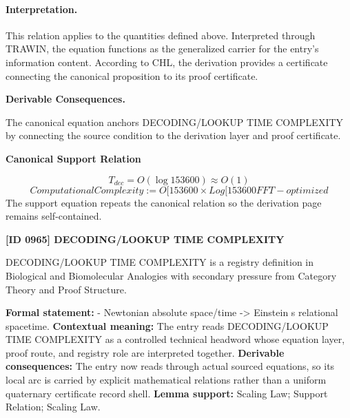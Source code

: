 \paragraph{Interpretation.}
This relation applies to the quantities defined above. Interpreted through TRAWIN, the equation functions as the generalized carrier for the entry’s information content. According to CHL, the derivation provides a certificate connecting the canonical proposition to its proof certificate.

\par\vspace{0.35em}
\noindent\textbf{Derivable Consequences.}\quad
\begingroup
\footnotesize
\raggedright
The canonical equation anchors DECODING/LOOKUP TIME COMPLEXITY by connecting the source condition to the derivation layer and proof certificate.
\par\endgroup

\noindent\textbf{Canonical Support Relation}\par
\[
T_{dec} = O(\log 153600) \approx O(1)
\]
\[
ComputationalComplexity := O[153600 \times Log[153600 FFT-optimized
\]
\noindent The support equation repeats the canonical relation so the derivation page remains self-contained.\par

\clearpage
\noindent\textbf{[ID 0965] DECODING/LOOKUP TIME COMPLEXITY}\par
\vspace{0.35em}
\begingroup\small
{}
DECODING/LOOKUP TIME COMPLEXITY is a registry definition in Biological and Biomolecular Analogies with secondary pressure from Category Theory and Proof Structure.

\begingroup\footnotesize\setlength{\emergencystretch}{3em}\sloppy
\textbf{Formal statement:} - Newtonian absolute space/time -> Einstein s relational spacetime. \textbf{Contextual meaning:} The entry reads DECODING/LOOKUP TIME COMPLEXITY as a controlled technical headword whose equation layer, proof route, and registry role are interpreted together. \textbf{Derivable consequences:} The entry now reads through actual sourced equations, so its local arc is carried by explicit mathematical relations rather than a uniform quaternary certificate record shell. \textbf{Lemma support:} Scaling Law; Support Relation; Scaling Law.\par
\endgroup

